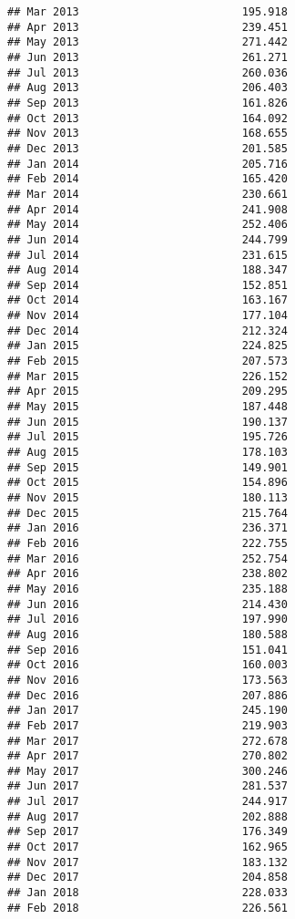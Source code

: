 \documentclass[
]{article}
\begin{document}
\begin{verbatim}
## Mar 2013                         195.918
## Apr 2013                         239.451
## May 2013                         271.442
## Jun 2013                         261.271
## Jul 2013                         260.036
## Aug 2013                         206.403
## Sep 2013                         161.826
## Oct 2013                         164.092
## Nov 2013                         168.655
## Dec 2013                         201.585
## Jan 2014                         205.716
## Feb 2014                         165.420
## Mar 2014                         230.661
## Apr 2014                         241.908
## May 2014                         252.406
## Jun 2014                         244.799
## Jul 2014                         231.615
## Aug 2014                         188.347
## Sep 2014                         152.851
## Oct 2014                         163.167
## Nov 2014                         177.104
## Dec 2014                         212.324
## Jan 2015                         224.825
## Feb 2015                         207.573
## Mar 2015                         226.152
## Apr 2015                         209.295
## May 2015                         187.448
## Jun 2015                         190.137
## Jul 2015                         195.726
## Aug 2015                         178.103
## Sep 2015                         149.901
## Oct 2015                         154.896
## Nov 2015                         180.113
## Dec 2015                         215.764
## Jan 2016                         236.371
## Feb 2016                         222.755
## Mar 2016                         252.754
## Apr 2016                         238.802
## May 2016                         235.188
## Jun 2016                         214.430
## Jul 2016                         197.990
## Aug 2016                         180.588
## Sep 2016                         151.041
## Oct 2016                         160.003
## Nov 2016                         173.563
## Dec 2016                         207.886
## Jan 2017                         245.190
## Feb 2017                         219.903
## Mar 2017                         272.678
## Apr 2017                         270.802
## May 2017                         300.246
## Jun 2017                         281.537
## Jul 2017                         244.917
## Aug 2017                         202.888
## Sep 2017                         176.349
## Oct 2017                         162.965
## Nov 2017                         183.132
## Dec 2017                         204.858
## Jan 2018                         228.033
## Feb 2018                         226.561

\end{verbatim}
\end{document}
